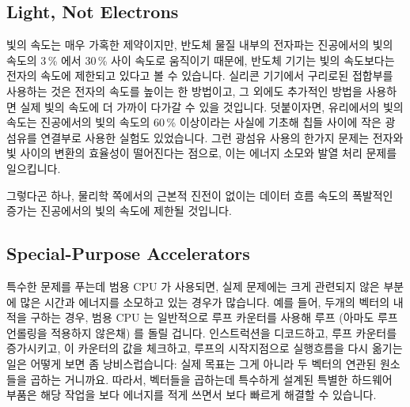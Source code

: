 \subsection{Light, Not Electrons}
\label{sec:cpu:Light, Not Electrons}

빛의 속도는 매우 가혹한 제약이지만, 반도체 물질 내부의 전자파는 진공에서의 빛의
속도의 3\,\% 에서 30\,\% 사이 속도로 움직이기 때문에, 반도체 기기는 빛의
속도보다는 전자의 속도에 제한되고 있다고 볼 수 있습니다.
실리콘 기기에서 구리로된 접합부를 사용하는 것은 전자의 속도를 높이는 한
방법이고, 그 외에도 추가적인 방법을 사용하면 실제 빛의 속도에 더 가까이 다가갈
수 있을 것입니다.
덧붙이자면, 유리에서의 빛의 속도는 진공에서의 빛의 속도의 60\,\% 이상이라는
사실에 기초해 칩들 사이에 작은 광섬유를 연결부로 사용한 실험도 있었습니다.
그런 광섬유 사용의 한가지 문제는 전자와 빛 사이의 변환의 효율성이 떨어진다는
점으로, 이는 에너지 소모와 발열 처리 문제를 일으킵니다.

그렇다곤 하나, 물리학 쪽에서의 근본적 진전이 없이는 데이터 흐름 속도의 폭발적인
증가는 진공에서의 빛의 속도에 제한될 것입니다.
\iffalse

Although the speed of light would be a hard limit, the fact is that
semiconductor devices are limited by the speed of electricity rather
than that of light, given that electric waves in semiconductor materials
move at between 3\,\% and 30\,\% of the speed of light in a vacuum.
The use of copper connections on silicon devices is one way to increase
the speed of electricity, and it is quite possible that additional
advances will push closer still to the actual speed of light.
In addition, there have been some experiments with tiny optical fibers
as interconnects within and between chips, based on the fact that
the speed of light in glass is more than 60\,\% of the speed of light
in a vacuum.
One obstacle to such optical fibers is the inefficiency conversion
between electricity and light and vice versa, resulting in both
power-consumption and heat-dissipation problems.

That said, absent some fundamental advances in the field of physics,
any exponential increases in the speed of data flow
will be sharply limited by the actual speed of light in a vacuum.
\fi

\subsection{Special-Purpose Accelerators}
\label{sec:cpu:Special-Purpose Accelerators}

특수한 문제를 푸는데 범용 CPU 가 사용되면, 실제 문제에는 크게 관련되지 않은
부분에 많은 시간과 에너지를 소모하고 있는 경우가 많습니다.
예를 들어, 두개의 벡터의 내적을 구하는 경우, 범용 CPU 는 일반적으로 루프
카운터를 사용해 루프 (아마도 루프 언롤링을 적용하지 않은채) 를 돌릴 겁니다.
인스트럭션을 디코드하고, 루프 카운터를 증가시키고, 이 카운터의 값을 체크하고,
루프의 시작지점으로 실행흐름을 다시 옮기는 일은 어떻게 보면 좀 낭비스럽습니다:
실제 목표는 그게 아니라 두 벡터의 연관된 원소들을 곱하는 거니까요.
따라서, 벡터들을 곱하는데 특수하게 설계된 특별한 하드웨어 부품은 해당 작업을
보다 에너지를 적게 쓰면서 보다 빠르게 해결할 수 있습니다.
\iffalse

